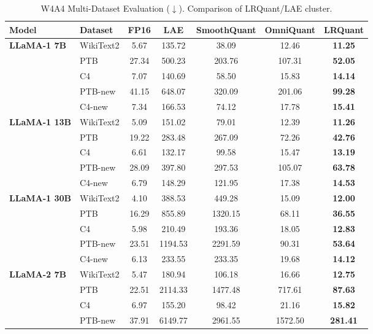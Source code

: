\begin{table}[htbp]
\centering
\caption{W4A4 Multi-Dataset Evaluation ($\downarrow$). Comparison of LRQuant/LAE cluster.}
\label{tab:w4a4-merged-lrquant}
\begin{tabular}{ll|ccccc}
  \toprule
  \textbf{Model} & \textbf{Dataset} & \textbf{FP16} & \textbf{LAE} & \textbf{SmoothQuant} & \textbf{OmniQuant} & \textbf{LRQuant} \\
  \midrule
  \multirow{5}{*}{\textbf{LLaMA-1 7B}}
  & WikiText2 & 5.67 & 135.72 & 38.09 & 12.46 & \textbf{11.25} \\
  & PTB & 27.34 & 500.23 & 203.76 & 107.31 & \textbf{52.05} \\
  & C4 & 7.07 & 140.69 & 58.50 & 15.83 & \textbf{14.14} \\
  & PTB-new & 41.15 & 648.07 & 320.09 & 201.06 & \textbf{99.28} \\
  & C4-new & 7.34 & 166.53 & 74.12 & 17.78 & \textbf{15.41} \\
  \midrule
  \multirow{5}{*}{\textbf{LLaMA-1 13B}}
  & WikiText2 & 5.09 & 151.02 & 79.01 & 12.39 & \textbf{11.26} \\
  & PTB & 19.22 & 283.48 & 267.09 & 72.26 & \textbf{42.76} \\
  & C4 & 6.61 & 132.17 & 99.58 & 15.47 & \textbf{13.19} \\
  & PTB-new & 28.09 & 397.80 & 297.53 & 105.07 & \textbf{63.78} \\
  & C4-new & 6.79 & 148.29 & 121.95 & 17.38 & \textbf{14.53} \\
  \midrule
  \multirow{5}{*}{\textbf{LLaMA-1 30B}}
  & WikiText2 & 4.10 & 388.53 & 449.28 & 15.09 & \textbf{12.00} \\
  & PTB & 16.29 & 855.89 & 1320.15 & 68.11 & \textbf{36.55} \\
  & C4 & 5.98 & 210.49 & 193.36 & 18.05 & \textbf{12.83} \\
  & PTB-new & 23.51 & 1194.53 & 2291.59 & 90.31 & \textbf{53.64} \\
  & C4-new & 6.13 & 233.55 & 233.35 & 19.68 & \textbf{14.12} \\
  \midrule
  \multirow{5}{*}{\textbf{LLaMA-2 7B}}
  & WikiText2 & 5.47 & 180.94 & 106.18 & 16.66 & \textbf{12.75} \\
  & PTB & 22.51 & 2114.33 & 1477.48 & 717.61 & \textbf{87.63} \\
  & C4 & 6.97 & 155.20 & 98.42 & 21.16 & \textbf{15.82} \\
  & PTB-new & 37.91 & 6149.77 & 2961.55 & 1572.50 & \textbf{281.41} \\

\end{tabular}
\end{table}
